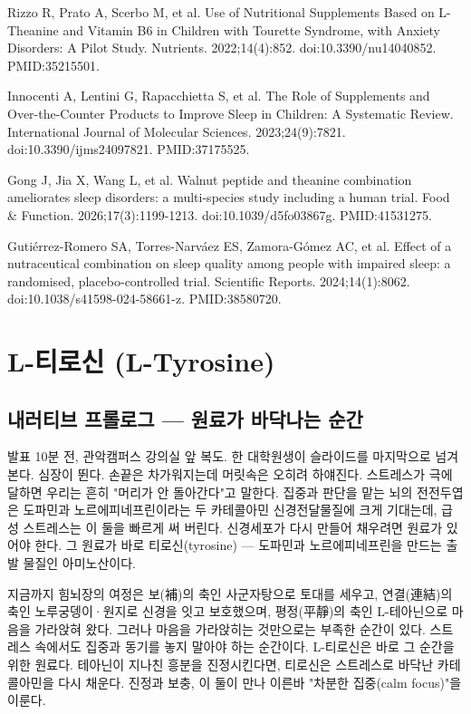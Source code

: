 \documentclass[12pt,oneside]{book}
\newcommand{\refend}{\endgroup\par}
\newcommand{\reff}[2]{\par\hangindent=7mm\hangafter=1\noindent[#1]\hspace{2mm}#2\par}
\begin{document}
\reff{79}{Rizzo R, Prato A, Scerbo M, et al. Use of Nutritional Supplements Based on L-Theanine and Vitamin B6 in Children with Tourette Syndrome, with Anxiety Disorders: A Pilot Study. Nutrients. 2022;14(4):852. doi:10.3390/nu14040852. PMID:35215501.}

\reff{80}{Innocenti A, Lentini G, Rapacchietta S, et al. The Role of Supplements and Over-the-Counter Products to Improve Sleep in Children: A Systematic Review. International Journal of Molecular Sciences. 2023;24(9):7821. doi:10.3390/ijms24097821. PMID:37175525.}

\reff{81}{Gong J, Jia X, Wang L, et al. Walnut peptide and theanine combination ameliorates sleep disorders: a multi-species study including a human trial. Food \& Function. 2026;17(3):1199-1213. doi:10.1039/d5fo03867g. PMID:41531275.}

\reff{82}{Gutiérrez-Romero SA, Torres-Narváez ES, Zamora-Gómez AC, et al. Effect of a nutraceutical combination on sleep quality among people with impaired sleep: a randomised, placebo-controlled trial. Scientific Reports. 2024;14(1):8062. doi:10.1038/s41598-024-58661-z. PMID:38580720.}

\refend


\chapter{L-티로신 (L-Tyrosine)}

\section{내러티브 프롤로그 — 원료가 바닥나는 순간}

발표 10분 전, 관악캠퍼스 강의실 앞 복도. 한 대학원생이 슬라이드를 마지막으로 넘겨 본다. 심장이 뛴다. 손끝은 차가워지는데 머릿속은 오히려 하얘진다. 스트레스가 극에 달하면 우리는 흔히 "머리가 안 돌아간다"고 말한다. 집중과 판단을 맡는 뇌의 전전두엽은 도파민과 노르에피네프린이라는 두 카테콜아민 신경전달물질에 크게 기대는데, 급성 스트레스는 이 둘을 빠르게 써 버린다. 신경세포가 다시 만들어 채우려면 원료가 있어야 한다. 그 원료가 바로 티로신(tyrosine) — 도파민과 노르에피네프린을 만드는 출발 물질인 아미노산이다.

지금까지 힘뇌장의 여정은 보(補)의 축인 사군자탕으로 토대를 세우고, 연결(連結)의 축인 노루궁뎅이·원지로 신경을 잇고 보호했으며, 평정(平靜)의 축인 L-테아닌으로 마음을 가라앉혀 왔다. 그러나 마음을 가라앉히는 것만으로는 부족한 순간이 있다. 스트레스 속에서도 집중과 동기를 놓지 말아야 하는 순간이다. L-티로신은 바로 그 순간을 위한 원료다. 테아닌이 지나친 흥분을 진정시킨다면, 티로신은 스트레스로 바닥난 카테콜아민을 다시 채운다. 진정과 보충, 이 둘이 만나 이른바 "차분한 집중(calm focus)"을 이룬다.
\end{document}
